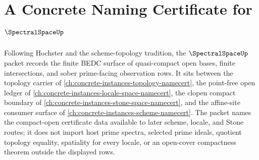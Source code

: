 \chapter{A Concrete Naming Certificate for $\SpectralSpaceUp$}
\label{ch:concrete-instances-spectral-space-namecert}

Following Hochster and the scheme-topology tradition, the $\SpectralSpaceUp$ packet records the finite BEDC surface of quasi-compact open bases, finite intersections, and sober prime-facing observation rows. It sits between the topology carrier of \autoref{ch:concrete-instances-topology-namecert}, the point-free open ledger of \autoref{ch:concrete-instances-locale-space-namecert}, the clopen compact boundary of \autoref{ch:concrete-instances-stone-space-namecert}, and the affine-site consumer surface of \autoref{ch:concrete-instances-scheme-namecert}. The packet names the compact-open certificate data available to later scheme, locale, and Stone routes; it does not import host prime spectra, selected prime ideals, quotient topology equality, spatiality for every locale, or an open-cover compactness theorem outside the displayed rows.

